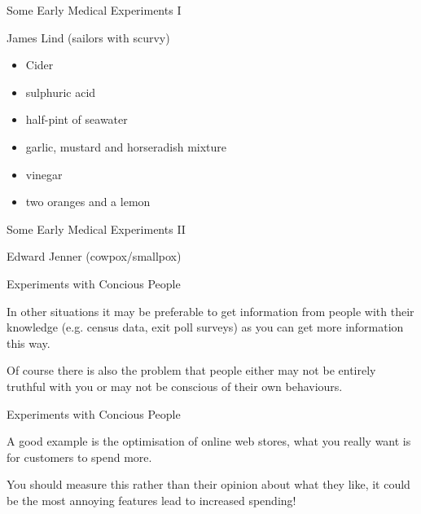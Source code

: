 \documentclass{beamer}
\begin{document}
\begin{frame}{Some Early Medical Experiments I}

James Lind (sailors with scurvy)

\begin{itemize}
\item Cider
\item sulphuric acid
\item half-pint of seawater
\item garlic, mustard and horseradish mixture
\item vinegar
\item two oranges and a lemon
\end{itemize}

\end{frame}


\begin{frame}{Some Early Medical Experiments II}

Edward Jenner (cowpox/smallpox)


\end{frame}



\begin{frame}{Experiments with Concious People}

In other situations it may be preferable to get information from people with their knowledge (e.g. census data, exit poll surveys) as you can get more information this way. 

\vspace{5mm}

Of course there is also the problem that people either may not be entirely truthful with you or may not be conscious of their own behaviours.  

\end{frame}

\begin{frame}{Experiments with Concious People}

A good example is the optimisation of online web stores, what you really want is for customers to spend more.

\vspace{5mm}

You should measure this rather than their opinion about what they like, it could be the most annoying features lead to increased spending!

\end{frame}
\end{document}
